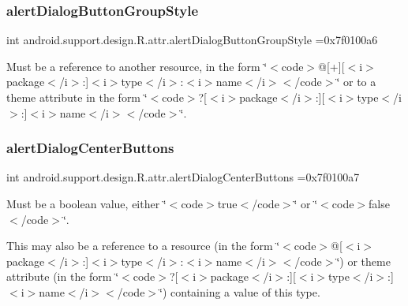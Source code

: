 \subsubsection{\texorpdfstring{alert\+Dialog\+Button\+Group\+Style}{alertDialogButtonGroupStyle}}
{\footnotesize\ttfamily int android.\+support.\+design.\+R.\+attr.\+alert\+Dialog\+Button\+Group\+Style =0x7f0100a6\hspace{0.3cm}{\ttfamily [static]}}

Must be a reference to another resource, in the form \char`\"{}$<$code$>$@\mbox{[}+\mbox{]}\mbox{[}$<$i$>$package$<$/i$>$\+:\mbox{]}$<$i$>$type$<$/i$>$\+:$<$i$>$name$<$/i$>$$<$/code$>$\char`\"{} or to a theme attribute in the form \char`\"{}$<$code$>$?\mbox{[}$<$i$>$package$<$/i$>$\+:\mbox{]}\mbox{[}$<$i$>$type$<$/i$>$\+:\mbox{]}$<$i$>$name$<$/i$>$$<$/code$>$\char`\"{}. \mbox{\label{classandroid_1_1support_1_1design_1_1R_1_1attr_a287951aa624e31d8150f3870825b706d}} 
\subsubsection{\texorpdfstring{alert\+Dialog\+Center\+Buttons}{alertDialogCenterButtons}}
{\footnotesize\ttfamily int android.\+support.\+design.\+R.\+attr.\+alert\+Dialog\+Center\+Buttons =0x7f0100a7\hspace{0.3cm}{\ttfamily [static]}}

Must be a boolean value, either \char`\"{}$<$code$>$true$<$/code$>$\char`\"{} or \char`\"{}$<$code$>$false$<$/code$>$\char`\"{}. 

This may also be a reference to a resource (in the form \char`\"{}$<$code$>$@\mbox{[}$<$i$>$package$<$/i$>$\+:\mbox{]}$<$i$>$type$<$/i$>$\+:$<$i$>$name$<$/i$>$$<$/code$>$\char`\"{}) or theme attribute (in the form \char`\"{}$<$code$>$?\mbox{[}$<$i$>$package$<$/i$>$\+:\mbox{]}\mbox{[}$<$i$>$type$<$/i$>$\+:\mbox{]}$<$i$>$name$<$/i$>$$<$/code$>$\char`\"{}) containing a value of this type. \mbox{\label{classandroid_1_1support_1_1design_1_1R_1_1attr_a6d4a8d67ca4397ec898ae4f527b4ea45}} 
